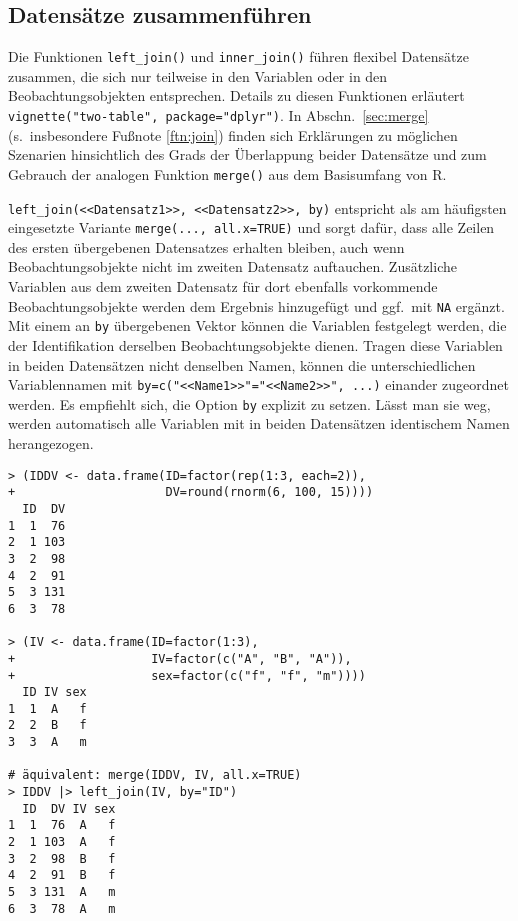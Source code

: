 \subsection{Datensätze zusammenführen}
\label{sec:dplyr_merge}

Die Funktionen \lstinline!left_join()! und \lstinline!inner_join()! führen flexibel Datensätze zusammen, die sich nur teilweise in den Variablen oder in den Beobachtungsobjekten entsprechen. Details zu diesen Funktionen erläutert \lstinline!vignette("two-table", package="dplyr")!. In Abschn.\ \ref{sec:merge} (s.\ insbesondere Fußnote \ref{ftn:join}) finden sich Erklärungen zu möglichen Szenarien hinsichtlich des Grads der Überlappung beider Datensätze und zum Gebrauch der analogen Funktion \lstinline!merge()! aus dem Basisumfang von R.

\lstinline!left_join(<<Datensatz1>>, <<Datensatz2>>, by)! entspricht als am häufigsten eingesetzte Variante \lstinline!merge(..., all.x=TRUE)! und sorgt dafür, dass alle Zeilen des ersten übergebenen Datensatzes erhalten bleiben, auch wenn Beobachtungsobjekte nicht im zweiten Datensatz auftauchen. Zusätzliche Variablen aus dem zweiten Datensatz für dort ebenfalls vorkommende Beobachtungsobjekte werden dem Ergebnis hinzugefügt und ggf.\ mit \lstinline!NA! ergänzt. Mit einem an \lstinline!by! übergebenen Vektor können die Variablen festgelegt werden, die der Identifikation derselben Beobachtungsobjekte dienen. Tragen diese Variablen in beiden Datensätzen nicht denselben Namen, können die unterschiedlichen Variablennamen mit \lstinline!by=c("<<Name1>>"="<<Name2>>", ...)! einander zugeordnet werden. Es empfiehlt sich, die Option \lstinline!by! explizit zu setzen. Lässt man sie weg, werden automatisch alle Variablen mit in beiden Datensätzen identischem Namen herangezogen.
\begin{lstlisting}
> (IDDV <- data.frame(ID=factor(rep(1:3, each=2)),
+                     DV=round(rnorm(6, 100, 15))))
  ID  DV
1  1  76
2  1 103
3  2  98
4  2  91
5  3 131
6  3  78

> (IV <- data.frame(ID=factor(1:3),
+                   IV=factor(c("A", "B", "A")),
+                   sex=factor(c("f", "f", "m"))))
  ID IV sex
1  1  A   f
2  2  B   f
3  3  A   m

# äquivalent: merge(IDDV, IV, all.x=TRUE)
> IDDV |> left_join(IV, by="ID")
  ID  DV IV sex
1  1  76  A   f
2  1 103  A   f
3  2  98  B   f
4  2  91  B   f
5  3 131  A   m
6  3  78  A   m
\end{lstlisting}

